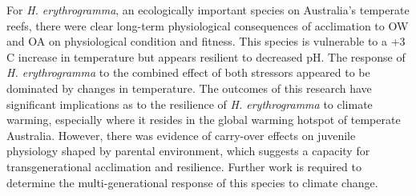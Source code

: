 For \textit{H. erythrogramma}, an ecologically important species on Australia's temperate reefs, there were clear long-term physiological consequences of acclimation to OW and OA on physiological condition and fitness. 
This species is vulnerable to a +3 \degree C increase in temperature but appears resilient to decreased pH.
The response of \textit{H. erythrogramma} to the combined effect of both stressors appeared to be dominated by changes in temperature.
The outcomes of this research have significant implications as to the resilience of \textit{H. erythrogramma} to climate warming, especially where it resides in the global warming hotspot of temperate Australia.
However, there was evidence of carry-over effects on juvenile physiology shaped by parental environment, which suggests a capacity for transgenerational acclimation and resilience. 
Further work is required to determine the multi-generational response of this species to climate change.




\clearpage
